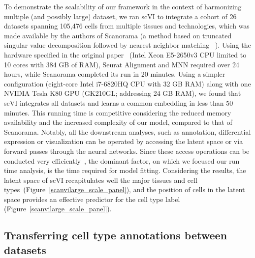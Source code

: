 To demonstrate the scalability of our framework in the context of harmonizing multiple (and possibly large) dataset, we ran scVI to integrate a cohort of 26 datasets spanning 105,476 cells from multiple tissues and technologies, which was made available by the authors of Scanorama (a method based on truncated singular value decomposition followed by nearest neighbor matching ~\cite{scanorama}). Using the hardware specified in the original paper~\cite{scanorama} (Intel Xeon E5-2650v3 CPU limited to 10 cores with 384 GB of RAM), Seurat Alignment and MNN required over 24 hours, while Scanorama completed its run in 20 minutes. Using a simpler configuration (eight-core Intel i7-6820HQ CPU with 32 GB RAM) along with one NVIDIA Tesla K80 GPU (GK210GL; addressing 24 GB RAM), we found that scVI integrates all datasets and learns a common embedding in less than 50 minutes. This running time is competitive considering the reduced memory availability and the increased complexity of our model, compared to that of Scanorama. Notably, all the downstream analyses, such as annotation, differential expression or visualization can be operated by accessing the latent space or via forward passes through the neural networks. Since these access operations can be conducted very efficiently~\cite{scvi}, the dominant factor, on which we focused our run time analysis, is the time required for model fitting. Considering the results, the latent space of scVI recapitulates well the major tissues and cell types~(Figure~\ref{scanvilarge_scale_panel}), and the position of cells in the latent space provides an effective predictor for the cell type label (Figure~\ref{scanvilarge_scale_panel}).


\subsection{Transferring cell type annotations between datasets}


